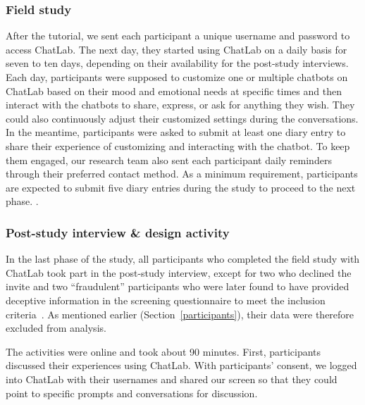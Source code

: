 \subsubsection{Field study}
After the tutorial, we sent each participant a unique username and password to access ChatLab. The next day, they started using ChatLab on a daily basis for seven to ten days, depending on their availability for the post-study interviews. 
Each day, participants were supposed to customize one or multiple chatbots on ChatLab based on their mood and emotional needs at specific times and then interact with the chatbots to share, express, or ask for anything they wish. They could also continuously adjust their customized settings during the conversations.
In the meantime, participants were asked to submit at least one diary entry to share their experience of customizing and interacting with the chatbot. To keep them engaged, our research team also sent each participant daily reminders through their preferred contact method.
As a minimum requirement, participants are expected to submit five diary entries during the study to proceed to the next phase.
.

\subsubsection{Post-study interview \& design activity}
In the last phase of the study, all participants who completed the field study with ChatLab took part in the post-study interview, except for two who declined the invite and two ``fraudulent'' participants who were later found to have provided deceptive information in the screening questionnaire to meet the inclusion criteria~\cite{panicker2024understanding, roehl2022imposter}. As mentioned earlier (Section~\ref{participants}), their data were therefore excluded from analysis.

The activities were online and took about 90 minutes. First, participants discussed their experiences using ChatLab. With participants' consent, we logged into ChatLab with their usernames and shared our screen so that they could point to specific prompts and conversations for discussion.

